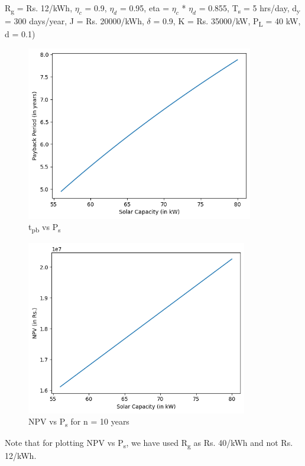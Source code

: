 \documentclass{article}
\begin{document}
R\textsubscript{g} = Rs. 12/kWh,
\(\eta_c\) = 0.9,
\(\eta_d\) = 0.95,
eta = \(\eta_c\) * \(\eta_d\) = 0.855,
T\textsubscript{s} = 5 hrs/day,
d\textsubscript{y} = 300 days/year,
J = Rs. 20000/kWh,
\(\delta\) = 0.9,
K = Rs. 35000/kW,
P\textsubscript{L} = 40 kW,
d = 0.1)
\begin{figure}[H]
	\centering
	\includegraphics[height=3in]{pb vs Ps.png}
	\caption[Optional Caption]{t\textsubscript{pb} vs P\textsubscript{s}}
	\label{fig:pb}
\end{figure}
\begin{figure}[H]
	\centering
	\includegraphics[height=3in]{npv vs Ps.png}
	\caption[Optional Caption]{NPV vs P\textsubscript{s} for n = 10 years}
	\label{fig:npv}
\end{figure}
Note that for plotting NPV vs P\textsubscript{s}, we have used R\textsubscript{g} as Rs. 40/kWh and not Rs. 12/kWh.\\
\end{document}
